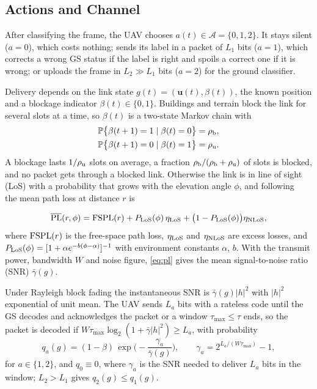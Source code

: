\documentclass[10pt,journal,compsoc]{IEEEtran}
\theoremstyle{remark}
\newcommand{\Prob}{\mathbb{P}}
\newcommand{\A}{\mathcal{A}}
\begin{document}
\subsection{Actions and Channel}\label{sec:act}
After classifying the frame, the UAV chooses $a(t)\in\A=\{0,1,2\}$. It stays silent ($a=0$), which costs nothing; sends its label in a packet of $L_1$ bits ($a=1$), which corrects a wrong GS status if the label is right and spoils a correct one if it is wrong; or uploads the frame in $L_2\gg L_1$ bits ($a=2$) for the ground classifier.

Delivery depends on the link state $g(t)=(\mathbf{u}(t),\beta(t))$, the known position and a blockage indicator $\beta(t)\in\{0,1\}$. Buildings and terrain block the link for several slots at a time, so $\beta(t)$ is a two-state Markov chain with
\begin{equation}\label{eq:block}
\begin{split}
\Prob\big\{\beta(t+1)=1\mid\beta(t)=0\big\}&=\rho_{\rm b},\\
\Prob\big\{\beta(t+1)=0\mid\beta(t)=1\big\}&=\rho_{\rm u}.
\end{split}
\end{equation}
A blockage lasts $1/\rho_{\rm u}$ slots on average, a fraction $\rho_{\rm b}/(\rho_{\rm b}+\rho_{\rm u})$ of slots is blocked, and no packet gets through a blocked link. Otherwise the link is in line of sight (LoS) with a probability that grows with the elevation angle $\phi$, and following~\cite{alhourani2014lap} the mean path loss at distance $r$ is

\begin{equation}\label{eq:pl}
\overline{\rm PL}(r,\phi)={\rm FSPL}(r)+P_{\rm LoS}(\phi)\,\eta_{\rm LoS}+\big(1-P_{\rm LoS}(\phi)\big)\eta_{\rm NLoS},
\end{equation}
where ${\rm FSPL}(r)$ is the free-space path loss, $\eta_{\rm LoS}$ and $\eta_{\rm NLoS}$ are excess losses, and $P_{\rm LoS}(\phi)=[1+\alpha e^{-b(\phi-\alpha)}]^{-1}$ with environment constants $\alpha$, $b$. With the transmit power, bandwidth $W$ and noise figure, \eqref{eq:pl} gives the mean signal-to-noise ratio (SNR) $\bar\gamma(g)$.

Under Rayleigh block fading the instantaneous SNR is $\bar\gamma(g)|h|^2$ with $|h|^2$ exponential of unit mean. The UAV sends $L_a$ bits with a rateless code until the GS decodes and acknowledges the packet or a window $\tau_{\max}\le\tau$ ends, so the packet is decoded if $W\tau_{\max}\log_2(1+\bar\gamma|h|^2)\ge L_a$, with probability
\begin{equation}\label{eq:succ}
q_a(g)=(1-\beta)\,\exp\!\Big(-\frac{\gamma_a}{\bar\gamma(g)}\Big),\qquad \gamma_a=2^{L_a/(W\tau_{\max})}-1,
\end{equation}
for $a\in\{1,2\}$,
and $q_0\equiv0$, where $\gamma_a$ is the SNR needed to deliver $L_a$ bits in the window; $L_2>L_1$ gives $q_2(g)\le q_1(g)$.
\end{document}
